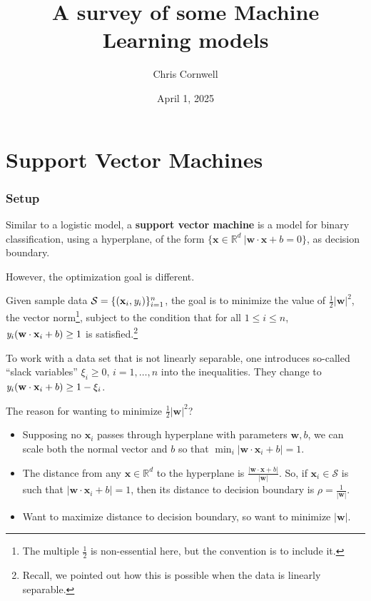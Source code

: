 \documentclass[smaller]{beamer}
\author{Chris Cornwell}
\date{April 1, 2025}
\title{A survey of some Machine Learning models}
\theoremstyle{example}
\newcommand{\x}{\textbf{x}}
\newcommand{\ix}[1]{{\it #1}}
\begin{document}
\begin{frame}
\titlepage
\end{frame}

\section{Support Vector Machines}

\begin{frame}
\frametitle{Setup}
    Similar to a logistic model, a \textbf{support vector machine} is a model for binary classification, using a hyperplane, of the form $\{\x\in\mathbb R^d\ | \textbf{w}\cdot\x+b = 0\}$, as decision boundary.

    However, the optimization goal is different. 
    
    \pause
    Given sample data $\mathcal S = \{(\x_i, \ix y_i)\}_{i=1}^n$, the goal is to minimize the value of $\frac12|\textbf{w}|^2$, the vector norm\footnote{The multiple $\frac12$ is non-essential here, but the convention is to include it.}, subject to the condition that for all $1\le i\le n$, $\ix y_i(\textbf{w}\cdot{\x}_i + b) \ge 1$ is satisfied.\footnote{Recall, we pointed out how this is possible when the data is linearly separable.}

    To work with a data set that is not linearly separable, one introduces so-called ``slack variables'' $\xi_i \ge 0$, $i=1,\ldots,n$ into the inequalities. They change to $\ix y_i(\textbf{w}\cdot\x_i + b) \ge 1 - \xi_i$.

    The reason for wanting to minimize $\frac12|\textbf{w}|^2$?
    \begin{itemize}
        \item Supposing no $\x_i$ passes through hyperplane with parameters $\textbf{w}, b$, we can scale both the normal vector and $b$ so that $\min_i|\textbf{w}\cdot\x_i + b| = 1$. 
        \item The distance from any $\x\in\mathbb R^d$ to the hyperplane is $\frac{|\textbf{w}\cdot\x + b|}{|\textbf{w}|}$. So, if $\x_i\in\mathcal S$ is such that $|\textbf{w}\cdot\x_i + b| = 1$, then its distance to decision boundary is $\rho = \frac1{|\textbf{w}|}$.
        \item Want to maximize distance to decision boundary, so want to minimize $|\textbf{w}|$.
    \end{itemize}
\vspace*{12pt}

\end{frame}
\end{document}

